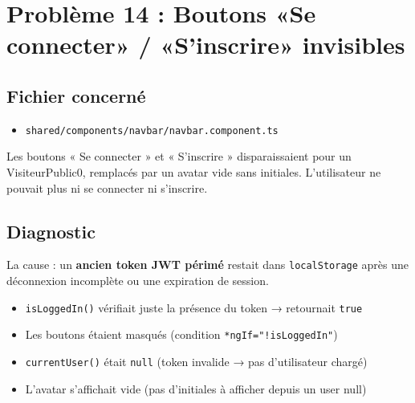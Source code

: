 \documentclass[a4paper,12pt,french]{article}
\begin{document}
\newpage

\section{Problème 14 : Boutons «Se connecter» / «S'inscrire» invisibles}

\subsection{Fichier concerné}
\begin{itemize}
    \item \texttt{shared/components/navbar/navbar.component.ts}
\end{itemize}

\begin{problembox}
Les boutons « Se connecter » et « S'inscrire » disparaissaient pour un VisiteurPublic0, remplacés par un avatar vide sans initiales. L'utilisateur ne pouvait plus ni se connecter ni s'inscrire.
\end{problembox}

\subsection{Diagnostic}

La cause : un \textbf{ancien token JWT périmé} restait dans \texttt{localStorage} après une déconnexion incomplète ou une expiration de session.

\begin{itemize}
    \item \texttt{isLoggedIn()} vérifiait juste la présence du token → retournait \texttt{true}
    \item Les boutons étaient masqués (condition \texttt{*ngIf="!isLoggedIn"})
    \item \texttt{currentUser()} était \texttt{null} (token invalide → pas d'utilisateur chargé)
    \item L'avatar s'affichait vide (pas d'initiales à afficher depuis un user null)
\end{itemize}
\end{document}
